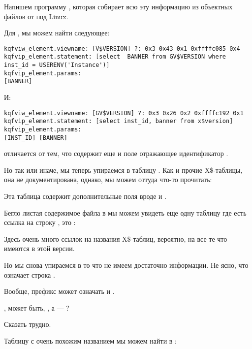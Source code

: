 Напишем программу \oracletables, которая собирает всю эту информацию из объектных файлов от \oracle под Linux.

Для , мы можем найти следующее:

\begin{lstlisting}[caption=Результат работы \OracleTablesName]
kqfviw_element.viewname: [V$VERSION] ?: 0x3 0x43 0x1 0xffffc085 0x4
kqfvip_element.statement: [select  BANNER from GV$VERSION where inst_id = USERENV('Instance')]
kqfvip_element.params:
[BANNER] 
\end{lstlisting}

И:

\begin{lstlisting}[caption=Результат работы \OracleTablesName]
kqfviw_element.viewname: [GV$VERSION] ?: 0x3 0x26 0x2 0xffffc192 0x1
kqfvip_element.statement: [select inst_id, banner from x$version]
kqfvip_element.params:
[INST_ID] [BANNER] 
\end{lstlisting}

  отличается от  тем, что содержит еще и поле отражающее идентификатор .

Но так или иначе, мы теперь упираемся в таблицу . Как и прочие X\$-таблицы, она не документирована, однако, мы можем оттуда что-то прочитать:



Эта таблица содержит дополнительные поля вроде  и .

Бегло листая содержимое файла  в \IDA мы можем увидеть еще одну таблицу где есть ссылка на строку , это :



Здесь очень много ссылок на названия X\$-таблиц, вероятно, на все те что имеются в \oracle этой версии.

Но мы снова упираемся в то что не имеем достаточно информации.
Не ясно, что означает строка .
 
Вообще, префикс  может означать  и .
 
, может быть, , а  --- ?
 
Сказать трудно.

Таблицу с очень похожим названием мы можем найти в :



